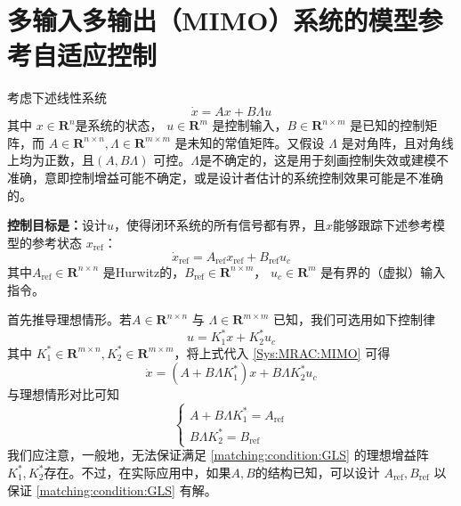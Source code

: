 \section{多输入多输出（MIMO）系统的模型参考自适应控制}\label{4Cref}
考虑下述线性系统
\begin{equation}
  \dot{x} = A  x + B \Lambda u\label{Sys:MRAC:MIMO}
\end{equation}
其中 $x \in \mathbf{R}^n$是系统的状态， $u \in \mathbf{R}^m$ 是控制输入，$B \in \mathbf{R}^{n \times m}$ 是已知的控制矩阵，而 $A \in \mathbf{R}^{n \times n}, \Lambda \in \mathbf{R}^{m \times m}$ 是未知的常值矩阵。又假设  $\Lambda$ 是对角阵，且对角线上均为正数，且$(A, B \Lambda)$ 可控。$\Lambda$是不确定的，这是用于刻画控制失效或建模不准确，意即控制增益可能不确定，或是设计者估计的系统控制效果可能是不准确的。

{\bf 控制目标是：}设计$u$，使得闭环系统的所有信号都有界，且$x$能够跟踪下述参考模型的参考状态 $x_{\ensuremath{\operatorname{ref}}}$：
 \begin{equation}
    \dot{x}_{\ensuremath{\operatorname{ref}}} =
    A_{\ensuremath{\operatorname{ref}}} x_{\ensuremath{\operatorname{ref}}} +
    B_{\ensuremath{\operatorname{ref}}} u_c\label{ideal_mimo}
  \end{equation}
其中$A_{\ensuremath{\operatorname{ref}}} \in \mathbf{R}^{n \times n}$ 是Hurwitz的，$B_{\ensuremath{\operatorname{ref}}} \in \mathbf{R}^{n \times m}$， $u_c \in \mathbf{R}^m$ 是有界的（虚拟）输入指令。

首先推导理想情形。若$A \in \mathbf{R}^{n \times n}$ 与 $\Lambda \in \mathbf{R}^{m\times m}$ 已知，我们可选用如下控制律
\[ u = K^{\ast}_1 x + K^{\ast}_2 u_c \]
其中 $K^{\ast}_1 \in \mathbf{R}^{m \times n}, K^{\ast}_2 \in \mathbf{R}^{m
\times m}$，将上式代入 \eqref{Sys:MRAC:MIMO} 可得
\[ \dot{x} = (A + B \Lambda K^{\ast}_1) x + B \Lambda K^{\ast}_2 u_c \]
与理想情形对比可知
\begin{equation}
  \left\{\begin{array}{l}
    A + B \Lambda K^{\ast}_1 = A_{\ensuremath{\operatorname{ref}}}\\
    B \Lambda K^{\ast}_2 = B_{\ensuremath{\operatorname{ref}}}
  \end{array}\right. \label{matching:condition:GLS}
\end{equation}
我们应注意，一般地，无法保证满足 \eqref{matching:condition:GLS} 的理想增益阵$K^{\ast}_1, K^{\ast}_2$存在。不过，在实际应用中，如果$A, B$的结构已知，可以设计 $A_{\ensuremath{\operatorname{ref}}}, B_{\ensuremath{\operatorname{ref}}}$ 以保证 \eqref{matching:condition:GLS} 有解。


